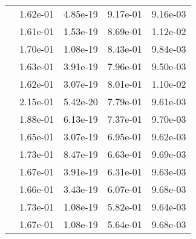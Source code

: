 \begin{table}
\begin{tabular}{c|cc|cc|}
\multicolumn{1}{|c|}{} & \multicolumn{1}{|c|}{  1.62e-01} & \multicolumn{1}{|c|}{  4.85e-19} & \multicolumn{1}{|c|}{  9.17e-01} & \multicolumn{1}{|c|}{  9.16e-03} \\ 
\multicolumn{1}{|c|}{} & \multicolumn{1}{|c|}{  1.61e-01} & \multicolumn{1}{|c|}{  1.53e-19} & \multicolumn{1}{|c|}{  8.69e-01} & \multicolumn{1}{|c|}{  1.12e-02} \\ 
\multicolumn{1}{|c|}{} & \multicolumn{1}{|c|}{  1.70e-01} & \multicolumn{1}{|c|}{  1.08e-19} & \multicolumn{1}{|c|}{  8.43e-01} & \multicolumn{1}{|c|}{  9.84e-03} \\ 
\multicolumn{1}{|c|}{} & \multicolumn{1}{|c|}{  1.63e-01} & \multicolumn{1}{|c|}{  3.91e-19} & \multicolumn{1}{|c|}{  7.96e-01} & \multicolumn{1}{|c|}{  9.50e-03} \\ 
\multicolumn{1}{|c|}{} & \multicolumn{1}{|c|}{  1.62e-01} & \multicolumn{1}{|c|}{  3.07e-19} & \multicolumn{1}{|c|}{  8.01e-01} & \multicolumn{1}{|c|}{  1.10e-02} \\ 
\multicolumn{1}{|c|}{} & \multicolumn{1}{|c|}{  2.15e-01} & \multicolumn{1}{|c|}{  5.42e-20} & \multicolumn{1}{|c|}{  7.79e-01} & \multicolumn{1}{|c|}{  9.61e-03} \\ 
\multicolumn{1}{|c|}{} & \multicolumn{1}{|c|}{  1.88e-01} & \multicolumn{1}{|c|}{  6.13e-19} & \multicolumn{1}{|c|}{  7.37e-01} & \multicolumn{1}{|c|}{  9.70e-03} \\ 
\multicolumn{1}{|c|}{} & \multicolumn{1}{|c|}{  1.65e-01} & \multicolumn{1}{|c|}{  3.07e-19} & \multicolumn{1}{|c|}{  6.95e-01} & \multicolumn{1}{|c|}{  9.62e-03} \\ 
\multicolumn{1}{|c|}{} & \multicolumn{1}{|c|}{  1.73e-01} & \multicolumn{1}{|c|}{  8.47e-19} & \multicolumn{1}{|c|}{  6.63e-01} & \multicolumn{1}{|c|}{  9.69e-03} \\ 
\multicolumn{1}{|c|}{} & \multicolumn{1}{|c|}{  1.67e-01} & \multicolumn{1}{|c|}{  3.91e-19} & \multicolumn{1}{|c|}{  6.31e-01} & \multicolumn{1}{|c|}{  9.63e-03} \\ 
\multicolumn{1}{|c|}{} & \multicolumn{1}{|c|}{  1.66e-01} & \multicolumn{1}{|c|}{  3.43e-19} & \multicolumn{1}{|c|}{  6.07e-01} & \multicolumn{1}{|c|}{  9.68e-03} \\ 
\multicolumn{1}{|c|}{} & \multicolumn{1}{|c|}{  1.73e-01} & \multicolumn{1}{|c|}{  1.08e-19} & \multicolumn{1}{|c|}{  5.82e-01} & \multicolumn{1}{|c|}{  9.64e-03} \\ 
\multicolumn{1}{|c|}{} & \multicolumn{1}{|c|}{  1.67e-01} & \multicolumn{1}{|c|}{  1.08e-19} & \multicolumn{1}{|c|}{  5.64e-01} & \multicolumn{1}{|c|}{  9.68e-03} \\ 

\end{tabular}
\end{table}

